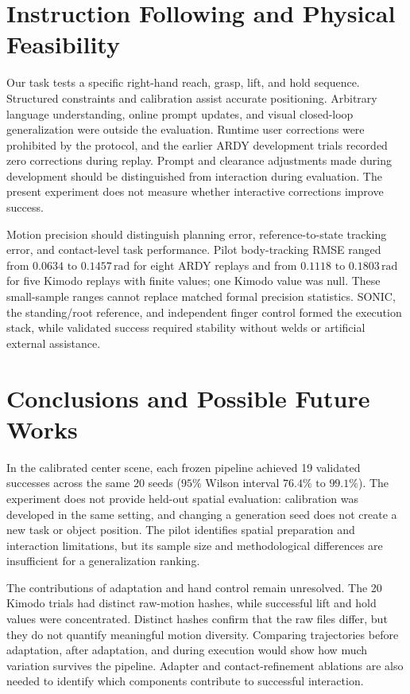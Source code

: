 \documentclass[11pt,a4paper]{article}
\begin{document}
\section*{Instruction Following and Physical Feasibility}

Our task tests a specific right-hand reach, grasp, lift, and hold sequence. Structured constraints and calibration assist accurate positioning. Arbitrary language understanding, online prompt updates, and visual closed-loop generalization were outside the evaluation. Runtime user corrections were prohibited by the protocol, and the earlier ARDY development trials recorded zero corrections during replay. Prompt and clearance adjustments made during development should be distinguished from interaction during evaluation. The present experiment does not measure whether interactive corrections improve success.

Motion precision should distinguish planning error, reference-to-state tracking error, and contact-level task performance. Pilot body-tracking RMSE ranged from \(0.0634\text{ to }0.1457\,\mathrm{rad}\) for eight ARDY replays and from \(0.1118\text{ to }0.1803\,\mathrm{rad}\) for five Kimodo replays with finite values; one Kimodo value was null. These small-sample ranges cannot replace matched formal precision statistics. SONIC, the standing/root reference, and independent finger control formed the execution stack, while validated success required stability without welds or artificial external assistance.

\section*{Conclusions and Possible Future Works}

In the calibrated center scene, each frozen pipeline achieved 19 validated successes across the same 20 seeds (\(95\%\) Wilson interval \(76.4\%\text{ to }99.1\%\)). The experiment does not provide held-out spatial evaluation: calibration was developed in the same setting, and changing a generation seed does not create a new task or object position. The pilot identifies spatial preparation and interaction limitations, but its sample size and methodological differences are insufficient for a generalization ranking.

The contributions of adaptation and hand control remain unresolved. The 20 Kimodo trials had distinct raw-motion hashes, while successful lift and hold values were concentrated. Distinct hashes confirm that the raw files differ, but they do not quantify meaningful motion diversity. Comparing trajectories before adaptation, after adaptation, and during execution would show how much variation survives the pipeline. Adapter and contact-refinement ablations are also needed to identify which components contribute to successful interaction.
\end{document}
